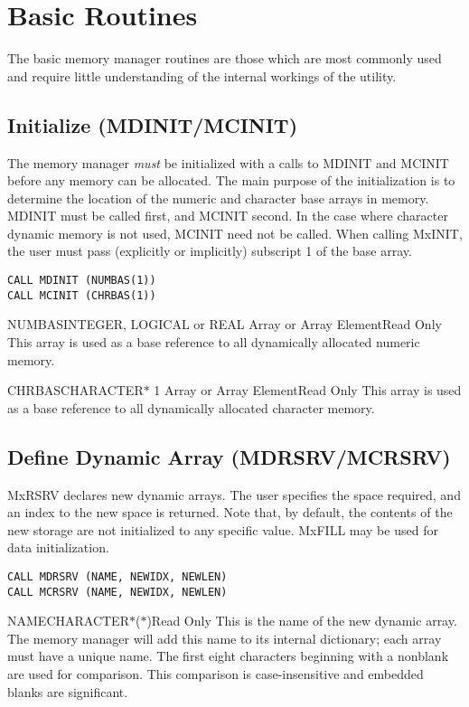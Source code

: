 \section{Basic Routines}\label{sec:mbas}
The basic memory manager routines are those which are most commonly used and
require little understanding of the internal workings of the utility.

\subsection{Initialize (MDINIT/MCINIT)}
The memory manager {\em must} be initialized with a calls to MDINIT and
MCINIT before any memory can be allocated.  The main purpose of the
initialization is to determine the location of the numeric and character
base arrays in memory. MDINIT must be called first, and MCINIT second. In
the case where character dynamic memory is not used, MCINIT need not be
called. When calling MxINIT, the user must pass (explicitly or
implicitly) subscript 1 of the base array.
\begin{verbatim}
CALL MDINIT (NUMBAS(1))
CALL MCINIT (CHRBAS(1))
\end{verbatim}

\begin{argy}{NUMBAS}{INTEGER, LOGICAL or REAL Array or Array Element}{Read
Only}
This array is used as a base reference to all dynamically allocated
numeric memory.
\end{argy}

\begin{argy}{CHRBAS}{CHARACTER$*$ 1 Array or Array Element}{Read Only}
This array is used as a base reference to all dynamically allocated
character memory.
\end{argy}

\subsection{Define Dynamic Array (MDRSRV/MCRSRV)}
MxRSRV declares new dynamic arrays.  The user specifies the space
required, and an index to the new space is returned.  Note that, by
default, the contents of the new storage are not initialized to any specific
value. MxFILL may be used for data initialization.
\begin{verbatim}
CALL MDRSRV (NAME, NEWIDX, NEWLEN)
CALL MCRSRV (NAME, NEWIDX, NEWLEN)
\end{verbatim}

\begin{argy}{NAME}{CHARACTER$*$($*$)}{Read Only}
This is the name of the new dynamic array. The memory manager will add this
name to its internal dictionary; each array must have a unique name.  The
first eight characters beginning with a nonblank are
used for comparison.
This comparison is case-insensitive and embedded blanks are
significant.
\end{argy}


